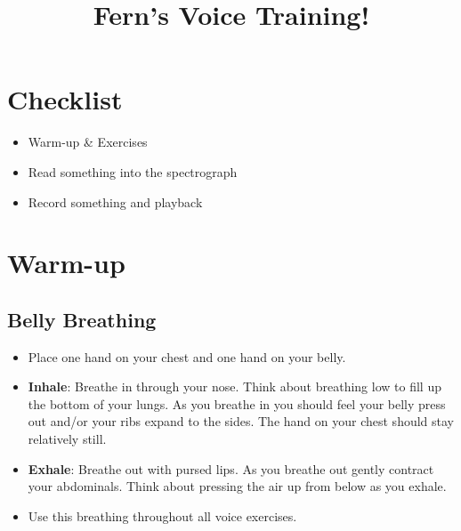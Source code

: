 \documentclass[12pt]{article}
\title{Fern's Voice Training!}
\author{}
\date{}
\begin{document}
\maketitle

\section*{Checklist}
\begin{itemize}[label=\(\square\)]
\item Warm-up \& Exercises
\item Read something into the spectrograph
\item Record something and playback
\end{itemize}

\pagebreak
\section*{Warm-up}
\subsection*{Belly Breathing}
\begin{itemize}
\item Place one hand on your chest and one hand on your belly.
\item \textbf{Inhale}: Breathe in through your nose. Think about breathing low to fill up the bottom of your lungs. As you breathe in you should feel your belly press out and/or your ribs expand to the sides. The hand on your chest should stay relatively still.
\item \textbf{Exhale}: Breathe out with pursed lips. As you breathe out gently contract your abdominals. Think about pressing the air up from below as you exhale.
\item Use this breathing throughout all voice exercises.
\end{itemize}

\end{document}
